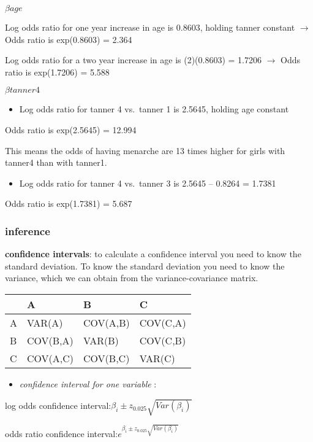 \documentclass[
]{article}
\providecommand{\tightlist}{%
  \setlength{\itemsep}{0pt}\setlength{\parskip}{0pt}}
\begin{document}
\(\beta age\)

Log odds ratio for one year increase in age is 0.8603, holding tanner
constant \(\to\) Odds ratio is exp(0.8603) = 2.364

Log odds ratio for a two year increase in age is (2)(0.8603) = 1.7206
\(\to\) Odds ratio is exp(1.7206) = 5.588

\(\beta tanner4\)

\begin{itemize}
\tightlist
\item
  Log odds ratio for tanner 4 vs.~tanner 1 is 2.5645, holding age
  constant
\end{itemize}

Odds ratio is exp(2.5645) = 12.994

This means the odds of having menarche are 13 times higher for girls
with tanner4 than with tanner1.

\begin{itemize}
\tightlist
\item
  Log odds ratio for tanner 4 vs.~tanner 3 is 2.5645 -- 0.8264 = 1.7381
\end{itemize}

Odds ratio is exp(1.7381) = 5.687

\hypertarget{inference-1}{%
\subsubsection{inference}\label{inference-1}}

\textbf{confidence intervals}: to calculate a confidence interval you
need to know the standard deviation. To know the standard deviation you
need to know the variance, which we can obtain from the
variance-covariance matrix.

\begin{longtable}[]{@{}llll@{}}
\toprule
& A & B & C\tabularnewline
\midrule
\endhead
A & VAR(A) & COV(A,B) & COV(C,A)\tabularnewline
B & COV(B,A) & VAR(B) & COV(C,B)\tabularnewline
C & COV(A,C) & COV(B,C) & VAR(C)\tabularnewline
\bottomrule
\end{longtable}

\begin{itemize}
\tightlist
\item
  \emph{confidence interval for one variable} :
\end{itemize}

log odds confidence
interval:\(\beta_i \pm z_{0.025} \sqrt{Var(\beta_i)}\)

odds ratio confidence
interval:\(e^{\beta_i \pm z_{0.025} \sqrt{Var(\beta_i)}}\)
\end{document}
